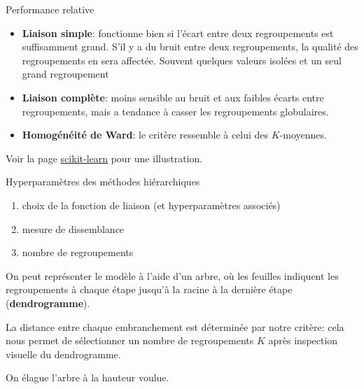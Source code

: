 \documentclass[
  ignorenonframetext,
]{beamer}
\providecommand{\tightlist}{%
  \setlength{\itemsep}{0pt}\setlength{\parskip}{0pt}}\usepackage{longtable,booktabs,array}
\begin{document}
\begin{frame}{Performance relative}
\protect\hypertarget{performance-relative}{}
\begin{itemize}
\item
  \textbf{Liaison simple}: fonctionne bien si l'écart entre deux
  regroupements est suffisamment grand. S'il y a du bruit entre deux
  regroupements, la qualité des regroupements en sera affectée. Souvent
  quelques valeurs isolées et un seul grand regroupement
\item
  \textbf{Liaison complète}: moins sensible au bruit et aux faibles
  écarts entre regroupements, mais a tendance à casser les regroupements
  globulaires.
\item
  \textbf{Homogénéité de Ward}: le critère ressemble à celui des
  \(K\)-moyennes.
\end{itemize}

Voir la page
\href{https://scikit-learn.org/stable/auto_examples/cluster/plot_linkage_comparison.html}{scikit-learn}
pour une illustration.
\end{frame}

\begin{frame}{Hyperparamètres des méthodes hiérarchiques}
\protect\hypertarget{hyperparamuxe8tres-des-muxe9thodes-hiuxe9rarchiques}{}
\begin{enumerate}
\tightlist
\item
  choix de la fonction de liaison (et hyperparamètres associés)
\item
  mesure de dissemblance
\item
  nombre de regroupements
\end{enumerate}

On peut représenter le modèle à l'aide d'un arbre, où les feuilles
indiquent les regroupements à chaque étape jusqu'à la racine à la
dernière étape (\textbf{dendrogramme}).

La distance entre chaque embranchement est déterminée par notre critère:
cela nous permet de sélectionner un nombre de regroupements \(K\) après
inspection visuelle du dendrogramme.

On élague l'arbre à la hauteur voulue.
\end{frame}
\end{document}
